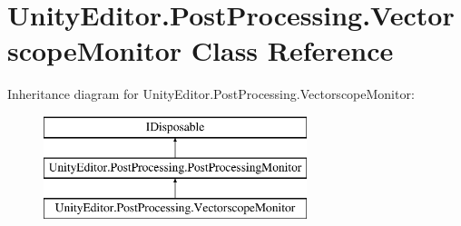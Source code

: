 \hypertarget{class_unity_editor_1_1_post_processing_1_1_vectorscope_monitor}{}\section{Unity\+Editor.\+Post\+Processing.\+Vectorscope\+Monitor Class Reference}
\label{class_unity_editor_1_1_post_processing_1_1_vectorscope_monitor}
Inheritance diagram for Unity\+Editor.\+Post\+Processing.\+Vectorscope\+Monitor\+:\begin{figure}[H]
\begin{center}
\leavevmode
\includegraphics[height=3.000000cm]{class_unity_editor_1_1_post_processing_1_1_vectorscope_monitor}
\end{center}
\end{figure}
